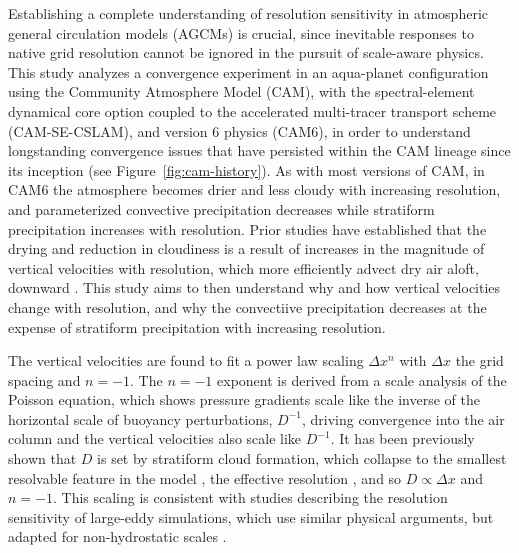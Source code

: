 \documentclass[times]{qjrms4}
\begin{document}
Establishing a complete understanding of resolution sensitivity in atmospheric general circulation models (AGCMs) is crucial, since inevitable responses to native grid resolution cannot be ignored in the pursuit of scale-aware physics. This study analyzes a convergence experiment in an aqua-planet configuration using the Community Atmosphere Model (CAM), with the spectral-element dynamical core option coupled to the accelerated multi-tracer transport scheme (CAM-SE-CSLAM), and version 6 physics (CAM6), in order to understand longstanding convergence issues that have persisted within the CAM lineage since its inception (see Figure~\ref{fig:cam-history}). As with most versions of CAM, in CAM6 the atmosphere becomes drier and less cloudy with increasing resolution, and parameterized convective precipitation decreases while stratiform precipitation increases with resolution. Prior studies have established that the drying and reduction in cloudiness is a result of increases in the magnitude of vertical velocities with resolution, which more efficiently advect dry air aloft, downward \citep{KW1991JGR,WETAL1995CD,YETAL2014JCLIM,HR2017JCLIM}. This study aims to then understand why and how vertical velocities change with resolution, and why the convectiive precipitation decreases at the expense of stratiform precipitation with increasing resolution.

The vertical velocities are found to fit a power law scaling $\Delta x^n$ with $\Delta x$ the grid spacing and $n=-1$. The $n=-1$ exponent is derived from a scale analysis of the Poisson equation, which shows pressure gradients scale like the inverse of the horizontal scale of buoyancy perturbations, $D^{-1}$, driving convergence into the air column and the vertical velocities also scale like $D^{-1}$. It has been previously shown that $D$ is set by stratiform cloud formation, which collapse to the smallest resolvable feature in the model \citep{HR2018JAMES}, the effective resolution \citep{S2011LNCSE}, and so $D \propto \Delta x$ and $n=-1$. This scaling is consistent with studies describing the resolution sensitivity of large-eddy simulations, which use similar physical arguments, but adapted for non-hydrostatic scales \citep{WETAL1997MWR,PG2006JAS,JR2016QJRMS}.
\end{document}
